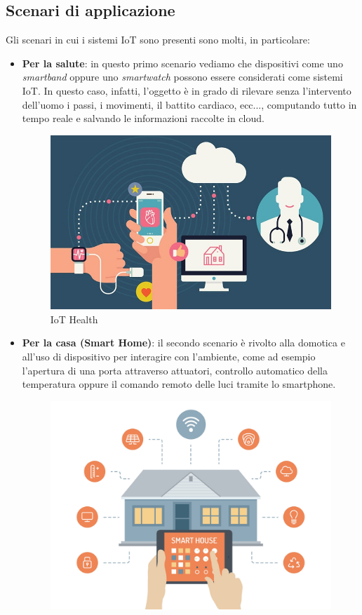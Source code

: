 \documentclass[10pt,a4paper,oneside]{scrbook}
\begin{document}
\subsection{Scenari di applicazione}
Gli scenari in cui i sistemi IoT sono presenti sono molti, in particolare:
    \begin{itemize}
        \item \textbf{Per la salute}: in questo primo scenario vediamo che dispositivi come uno \textit{smartband} oppure uno \textit{smartwatch} possono essere 
        considerati come sistemi IoT. In questo caso, infatti, l'oggetto è in grado di rilevare senza l'intervento dell'uomo i passi, i movimenti, il battito cardiaco, ecc...,
        computando tutto in tempo reale e salvando le informazioni raccolte in cloud.
        \begin{figure}[h]
            \centering
            \includegraphics[width=0.7\linewidth]{img/benefits-of-iot-health-applications-of-iot.jpg}
            \caption{IoT Health}
            \label{fig:IoT-products-for-health}
        \end{figure}
        \item \textbf{Per la casa (Smart Home)}: il secondo scenario è rivolto alla domotica e all'uso di dispositivo per interagire con l'ambiente,
        come ad esempio l'apertura di una porta attraverso attuatori, controllo automatico della temperatura oppure il comando remoto delle luci tramite lo smartphone.
        \begin{figure}[h]
            \centering
            \includegraphics[width=0.7\linewidth]{img/smarthome.jpeg}

\end{figure}
\end{itemize}
\end{document}
